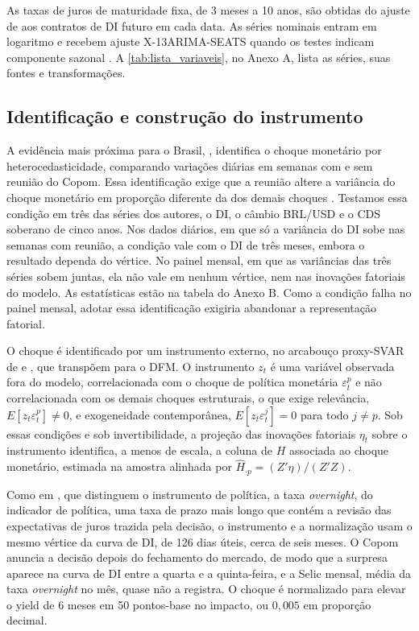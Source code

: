\documentclass[preprint,authoryear,review,12pt]{elsarticle}
\begin{document}
As taxas de juros de maturidade fixa, de 3 meses a 10 anos, são obtidas do ajuste de \cite{svensson1994estimating} aos contratos de DI futuro em cada data. As séries nominais entram em logaritmo e recebem ajuste X-13ARIMA-SEATS quando os testes indicam componente sazonal \cite{sax2018seasonal}. A \autoref{tab:lista_variaveis}, no Anexo A, lista as séries, suas fontes e transformações.

\subsection{Identificação e construção do instrumento}
\label{sec:identificacao}

A evidência mais próxima para o Brasil, \cite{goncalves2025}, identifica o choque monetário por heterocedasticidade, comparando variações diárias em semanas com e sem reunião do Copom. Essa identificação exige que a reunião altere a variância do choque monetário em proporção diferente da dos demais choques \citep{rigobon2003}. Testamos essa condição em três das séries dos autores, o DI, o câmbio BRL/USD e o CDS soberano de cinco anos. Nos dados diários, em que só a variância do DI sobe nas semanas com reunião, a condição vale com o DI de três meses, embora o resultado dependa do vértice. No painel mensal, em que as variâncias das três séries sobem juntas, ela não vale em nenhum vértice, nem nas inovações fatoriais do modelo. As estatísticas estão na tabela do Anexo B. Como a condição falha no painel mensal, adotar essa identificação exigiria abandonar a representação fatorial.

O choque é identificado por um instrumento externo, no arcabouço proxy-SVAR de \cite{stockwatson2018} e \cite{gertler2015}, que \cite{alessi} transpõem para o DFM. O instrumento $z_t$ é uma variável observada fora do modelo, correlacionada com o choque de política monetária $\varepsilon_t^{p}$ e não correlacionada com os demais choques estruturais, o que exige relevância, $E[z_t \varepsilon_t^{p}] \neq 0$, e exogeneidade contemporânea, $E[z_t \varepsilon_t^{j}] = 0$ para todo $j \neq p$. Sob essas condições e sob invertibilidade, a projeção das inovações fatoriais $\eta_t$ sobre o instrumento identifica, a menos de escala, a coluna de $H$ associada ao choque monetário, estimada na amostra alinhada por $\hat{H}_{\cdot p} = (Z'\eta)/(Z'Z)$.

Como em \cite{gertler2015}, que distinguem o instrumento de política, a taxa \textit{overnight}, do indicador de política, uma taxa de prazo mais longo que contém a revisão das expectativas de juros trazida pela decisão, o instrumento e a normalização usam o mesmo vértice da curva de DI, de 126 dias úteis, cerca de seis meses. O Copom anuncia a decisão depois do fechamento do mercado, de modo que a surpresa aparece na curva de DI entre a quarta e a quinta-feira, e a Selic mensal, média da taxa \textit{overnight} no mês, quase não a registra. O choque é normalizado para elevar o yield de 6 meses em 50 pontos-base no impacto, ou $0{,}005$ em proporção decimal.
\end{document}
